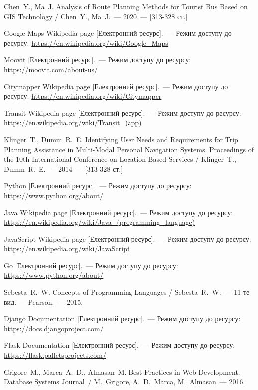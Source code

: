 \begin{thebibliography}
	 Chen~Y., Ma~J. Analysis of Route Planning Methods for Tourist Bus Based on GIS Technology / Chen~Y., Ma~J.~--- 2020~--- [313-328 ст.]
	

	 Google Maps Wikipedia page [Електронний ресурс].~--- Режим доступу до ресурсу:
	\url{https://en.wikipedia.org/wiki/Google_Maps}

	 Moovit [Електронний ресурс].~--- Режим доступу до ресурсу:
	\url{https://moovit.com/about-us/}

	 Citymapper Wikipedia page [Електронний ресурс].~--- Режим доступу до ресурсу:
	\url{https://en.wikipedia.org/wiki/Citymapper}


	 Transit Wikipedia page [Електронний ресурс].~--- Режим доступу до ресурсу:
	\url{https://en.wikipedia.org/wiki/Transit_(app)}
	


	 Klinger~T., Dumm~R.~E. Identifying User Needs and Requirements for Trip Planning Assistance in Multi-Modal Personal Navigation Systems. Proceedings of the 10th International Conference on Location Based Services / Klinger~T., Dumm~R.~E.~--- 2014~--- [313-328 ст.]



	 Python [Електронний ресурс].~--- Режим доступу до ресурсу:
	\url{https://www.python.org/about/}

	 Java Wikipedia page [Електронний ресурс].~--- Режим доступу до ресурсу:
	\url{https://en.wikipedia.org/wiki/Java_(programming_language)}

	 JavaScript Wikipedia page [Електронний ресурс].~--- Режим доступу до ресурсу:
	\url{https://en.wikipedia.org/wiki/JavaScript}

	 Go [Електронний ресурс].~--- Режим доступу до ресурсу:
	\url{https://www.python.org/about/}
	
	 Sebesta~R.~W.  Concepts of Programming Languages / Sebesta~R.~W.~--- 11-те вид. --- Pearson.~--- 2015.


	 Django Documentation [Електронний ресурс].~--- Режим доступу до ресурсу:
	\url{https://docs.djangoproject.com/}

	 Flask Documentation [Електронний ресурс].~--- Режим доступу до ресурсу:
	\url{https://flask.palletsprojects.com/}


	 Grigore~M., Marca~A.~D., Almasan~M.  Best Practices in Web Development. Database Systems Journal~/ M.~Grigore, A.~D.~Marca, M.~Almasan~--- 2016.
\end{thebibliography}
